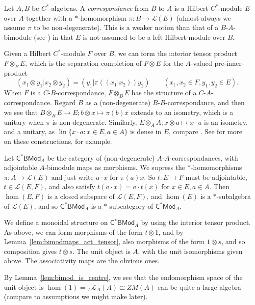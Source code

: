 \documentclass[a4paper,11pt]{article}
\theoremstyle{plain}
\theoremstyle{remark}
\newenvironment{example}
  {\pushQED{\qed}\renewcommand{\qedsymbol}{$\triangle$}\examplex}
  {\popQED\endexamplex}
\newcommand{\mc}[1]{\mathcal{#1}}
\newcommand{\lin}{\operatorname{lin}}
\newcommand{\catHCStar}[1]{\textsf{C$^*$Mod}_{#1}}
\newcommand{\catHCStarBi}[1]{\textsf{C$^*$BMod}_{#1}}
\begin{document}
\begin{example}\label{eg:tensor_bimods}
Let $A,B$ be $C^*$-algebras.  A \emph{correspondance} from $B$ to $A$ is a Hilbert $C^*$-module $E$ over $A$ together with a $*$-homomorphism $\pi \colon B \to \mc L(E)$ (almost always we assume $\pi$ to be non-degenerate).  This is a weaker notion than that of a $B$-$A$-bimodule (see \cite{BMS_quasimults}) in that $E$ is not assumed to be a left Hilbert module over $B$.

Given a Hilbert $C^*$-module $F$ over $B$, we can form the interior tensor product $F\otimes_B E$, which is the separation completion of $F \otimes E$ for the $A$-valued pre-inner-product
\[ (x_1 \otimes y_1 | x_2\otimes y_2) = (y_1|\pi((x_1|x_2))y_2) \qquad (x_1,x_2\in F, y_1,y_2\in E). \]
When $F$ is a $C$-$B$-correspondance, $F\otimes_BE$ has the structure of a $C$-$A$-correspondance.  Regard $B$ as a (non-degenerate) $B$-$B$-correspondance, and then we see that $B \otimes_B E \to E; b \otimes x \mapsto \pi(b)x$ extends to an isometry, which is a unitary when $\pi$ is non-degenerate.  Similarly, $E \otimes_A A; x \otimes a \mapsto x\cdot a$ is an isometry, and a unitary, as $\lin\{ x \cdot a : x\in E, a\in A \}$ is dense in $E$, compare \cite[page~5]{Lance_HilbModsBook}.  See \cite[Chapter~4]{Lance_HilbModsBook} for more on these constructions, for example.

Let $\catHCStarBi{A}$ be the category of (non-degenerate) $A$-$A$-correspondances, with adjointable $A$-bimodule maps as morphisms.  
We supress the $*$-homomorphisms $\pi \colon A \to \mc L(E)$ and just write $a\cdot x$ for $\pi(a)x$.  So $t\colon E \to F$ must be adjointable, $t\in\mc L(E,F)$, and also satisfy $t(a\cdot x)=a\cdot t(x)$ for $x\in E, a\in A$.  Then $\hom(E,F)$ is a closed subspace of $\mc L(E,F)$, and $\hom(E)$ is a $*$-subalgebra of $\mc L(E)$, and so $\catHCStarBi{A}$ is a $*$-subcategory of $\catHCStar{A}$.

We define a monoidal structure on $\catHCStarBi{A}$ by using the interior tensor product.  As above, we can form morphisms of the form $t\otimes 1$, and by Lemma~\ref{lem:bimodmaps_act_tensor}, also morphisms of the form $1\otimes s$, and so composition gives $t\otimes s$.  The unit object is $A$, with the unit isomorphisms given above.  The associativity maps are the obvious ones.

By Lemma~\ref{lem:bimod_is_centre}, we see that the endomorphism space of the unit object is $\hom(1) = {}_A \mc L_A(A) \cong ZM(A)$ can be quite a large algebra (compare to assumptions we might make later).
\end{example}
\end{document}
